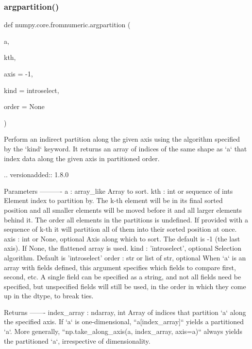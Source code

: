 \subsubsection{\texorpdfstring{argpartition()}{argpartition()}}
{\footnotesize\ttfamily def numpy.\+core.\+fromnumeric.\+argpartition (\begin{DoxyParamCaption}\item[{}]{a,  }\item[{}]{kth,  }\item[{}]{axis = {\ttfamily -\/1},  }\item[{}]{kind = {\ttfamily \textquotesingle{}introselect\textquotesingle{}},  }\item[{}]{order = {\ttfamily None} }\end{DoxyParamCaption})}

\begin{DoxyVerb}Perform an indirect partition along the given axis using the
algorithm specified by the `kind` keyword. It returns an array of
indices of the same shape as `a` that index data along the given
axis in partitioned order.

.. versionadded:: 1.8.0

Parameters
----------
a : array_like
    Array to sort.
kth : int or sequence of ints
    Element index to partition by. The k-th element will be in its
    final sorted position and all smaller elements will be moved
    before it and all larger elements behind it. The order all
    elements in the partitions is undefined. If provided with a
    sequence of k-th it will partition all of them into their sorted
    position at once.
axis : int or None, optional
    Axis along which to sort. The default is -1 (the last axis). If
    None, the flattened array is used.
kind : {'introselect'}, optional
    Selection algorithm. Default is 'introselect'
order : str or list of str, optional
    When `a` is an array with fields defined, this argument
    specifies which fields to compare first, second, etc. A single
    field can be specified as a string, and not all fields need be
    specified, but unspecified fields will still be used, in the
    order in which they come up in the dtype, to break ties.

Returns
-------
index_array : ndarray, int
    Array of indices that partition `a` along the specified axis.
    If `a` is one-dimensional, ``a[index_array]`` yields a partitioned `a`.
    More generally, ``np.take_along_axis(a, index_array, axis=a)`` always
    yields the partitioned `a`, irrespective of dimensionality.


\end{DoxyVerb}
